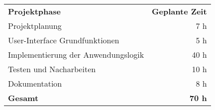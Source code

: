 \begin{tabular}{lr}
	\rowcolor{heading}\textbf{Projektphase} & \textbf{Geplante Zeit} \\
	Projektplanung & 7 h \\
	\rowcolor{odd}User-Interface Grundfunktionen & 5 h \\
	Implementierung der Anwendungslogik & 40 h \\
	\rowcolor{odd}Testen und Nacharbeiten & 10 h \\
	Dokumentation & 8 h \\
	\hline
	\hline
	\rowcolor{heading}\textbf{Gesamt} & \textbf{70 h} \\
\end{tabular}